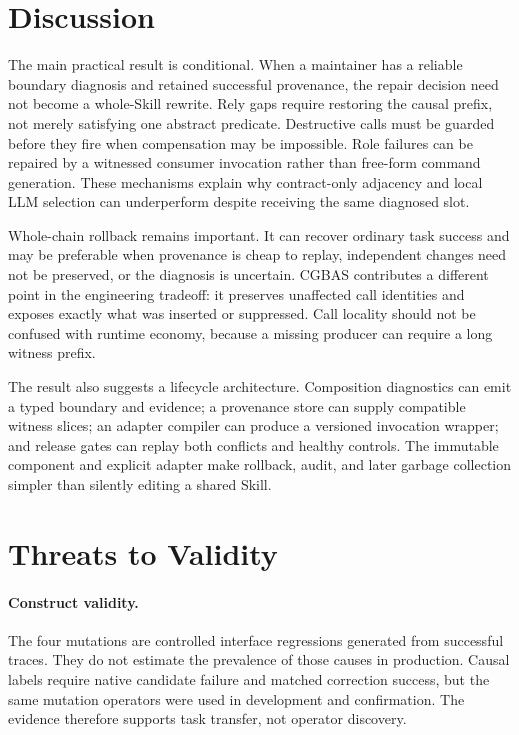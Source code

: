 \documentclass[10pt]{article}
\begin{document}
\section{Discussion}

The main practical result is conditional. When a maintainer has a reliable
boundary diagnosis and retained successful provenance, the repair decision need
not become a whole-Skill rewrite. Rely gaps require restoring the causal prefix,
not merely satisfying one abstract predicate. Destructive calls must be guarded
before they fire when compensation may be impossible. Role failures can be
repaired by a witnessed consumer invocation rather than free-form command
generation. These mechanisms explain why contract-only adjacency and local LLM
selection can underperform despite receiving the same diagnosed slot.

Whole-chain rollback remains important. It can recover ordinary task success and
may be preferable when provenance is cheap to replay, independent changes need not
be preserved, or the diagnosis is uncertain. CGBAS contributes a different point
in the engineering tradeoff: it preserves unaffected call identities and exposes
exactly what was inserted or suppressed. Call locality should not be confused
with runtime economy, because a missing producer can require a long witness prefix.

The result also suggests a lifecycle architecture. Composition diagnostics can
emit a typed boundary and evidence; a provenance store can supply compatible
witness slices; an adapter compiler can produce a versioned invocation wrapper;
and release gates can replay both conflicts and healthy controls. The immutable
component and explicit adapter make rollback, audit, and later garbage collection
simpler than silently editing a shared Skill.

\section{Threats to Validity}

\paragraph{Construct validity.}
The four mutations are controlled interface regressions generated from successful
traces. They do not estimate the prevalence of those causes in production. Causal
labels require native candidate failure and matched correction success, but the
same mutation operators were used in development and confirmation. The evidence
therefore supports task transfer, not operator discovery.
\end{document}
